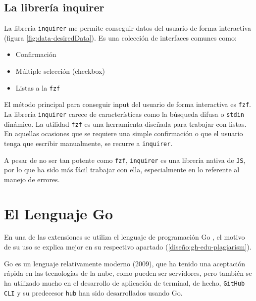 \subsection{La librería inquirer}
La librería \verb|inquirer| me permite conseguir datos del usuario de forma interactiva (figura \ref{fig:data-desiredData}). Es una colección de interfaces comunes como:
\begin{itemize}
    \item Confirmación
    \item Múltiple selección (checkbox)
    \item Listas a la \verb|fzf|
\end{itemize}

El método principal para conseguir input del usuario de forma interactiva es \verb|fzf|. La librería \verb|inquirer| carece de  características como la búsqueda difusa o \verb|stdin| dinámico. La utilidad \verb|fzf| es una herramienta diseñada para trabajar con listas.  En aquellas ocasiones que se requiere una simple confirmación o que el usuario tenga que escribir manualmente, se recurre a \verb|inquirer|. 

A pesar de no ser tan potente como \verb|fzf|, \verb|inquirer| es una librería nativa de \verb|JS|, por lo que ha sido más fácil trabajar con ella, especialmente en lo referente al manejo de errores.

\section{El Lenguaje Go} \label{go}
En una de las extensiones se utiliza el lenguaje de programación Go \cite{go}, el motivo de su uso se explica mejor en su respectivo apartado (\ref{diseño:gh-edu-plagiarism}).

Go es un lenguaje relativamente moderno (2009), que ha tenido una aceptación rápida en las tecnologías de la nube, como pueden ser servidores, pero también se ha utilizado mucho en el desarrollo de aplicación de terminal, de hecho, \verb|GitHub CLI| y su predecesor \verb|hub| han sido desarrollados usando Go.

